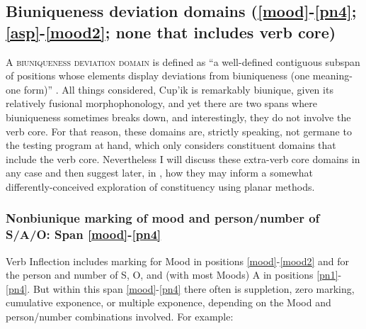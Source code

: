 \documentclass[output=paper]{langscibook}
\begin{document}
\subsection{Biuniqueness deviation domains (\ref{mood}-\ref{pn4}; \ref{asp}-\ref{mood2}; none that includes verb core)} \label{sec:5.8}

\textsc{A} \textsc{biuniqueness} \textsc{deviation} \textsc{domain} is defined as ``a well-defined contiguous subspan of positions whose elements display deviations from biuniqueness (one meaning-one form)'' \citep[16]{Tallman2021}. All things considered, Cup'ik is remarkably biunique, given its relatively fusional morphophonology, and yet there are two spans where biuniqueness sometimes breaks down, and interestingly, they do not involve the verb core. For that reason, these domains are, strictly speaking, not germane to the testing program at hand, which only considers constituent domains that include the verb core. Nevertheless I will discuss these extra-verb core domains in any case and then suggest later, in , how they may inform a somewhat differently-conceived exploration of constituency using planar methods.

\subsubsection{Nonbiunique marking of mood and person/number of S/A/O: Span \ref{mood}-\ref{pn4}}
\label{sec:5.8.1}

Verb Inflection includes marking for Mood in positions \ref{mood}-\ref{mood2} and for the person and number of S, O, and (with most Moods) A in positions \ref{pn1}-\ref{pn4}. But within this span \ref{mood}-\ref{pn4} there often is suppletion, zero marking, cumulative exponence, or multiple exponence, depending on the Mood and person/number combinations involved. For example:
\end{document}

